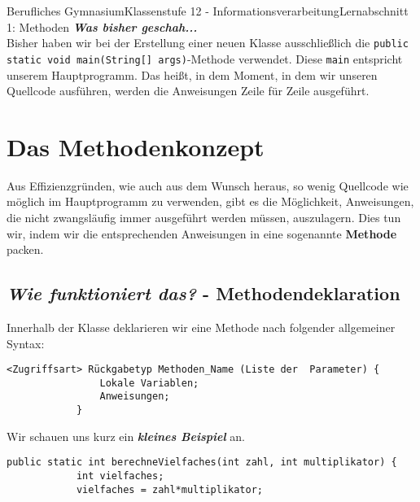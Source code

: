 \documentclass[11pt,oneside,openany,headings=optiontotoc,11pt,numbers=noenddot]{article}
\begin{document}
	\begin{worksheet}{Berufliches Gymnasium}{Klassenstufe 12 - Informationsverarbeitung}{Lernabschnitt 1: Methoden}
		\setlength{\columnseprule}{0pt}
		\textit{\textbf{Was bisher geschah...}}\\
		Bisher haben wir bei der Erstellung einer neuen Klasse ausschließlich die \lstinline[style=JavaInputStyle,backgroundcolor=\color{backcolor}]|public static void main(String[] args)|-Methode verwendet. Diese \lstinline[style=JavaInputStyle,backgroundcolor=\color{backcolor}]|main| entspricht unserem Hauptprogramm. Das heißt, in dem Moment, in dem wir unseren Quellcode ausführen, werden die Anweisungen Zeile für Zeile ausgeführt.\\
		\section{Das Methodenkonzept}
		Aus Effizienzgründen, wie auch aus dem Wunsch heraus, so wenig Quellcode wie möglich im Hauptprogramm zu verwenden, gibt es die Möglichkeit, Anweisungen, die nicht zwangsläufig immer ausgeführt werden müssen, auszulagern. Dies tun wir, indem wir die entsprechenden Anweisungen in eine sogenannte \textbf{Methode} packen.
		\subsection{\textit{Wie funktioniert das?} - Methodendeklaration}
		Innerhalb der Klasse deklarieren wir eine Methode nach folgender allgemeiner Syntax:
		\begin{lstlisting}[style=JavaInputStyle]
			<Zugriffsart> Rückgabetyp Methoden_Name (Liste der  Parameter) {
				Lokale Variablen;
				Anweisungen;
			}
		\end{lstlisting}
		Wir schauen uns kurz ein \textit{\textbf{kleines Beispiel}} an.
		\begin{lstlisting}[style=JavaInputStyle]
		public static int berechneVielfaches(int zahl, int multiplikator) {
			int vielfaches;
			vielfaches = zahl*multiplikator;
			

\end{lstlisting}
\end{worksheet}
\end{document}
